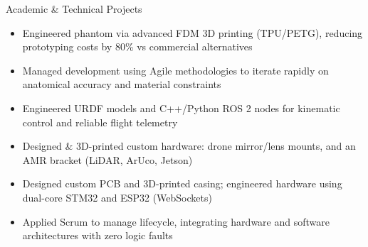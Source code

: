 \documentclass{resume}
\begin{document}
\begin{experienceSection}{Academic \& Technical Projects}
    \projectItem[
        title={Open-Source Gastrointestinal Medical Phantom},
        duration={Ago-Dic 2025 – Feb-Jun 2026},
        keyHighlight={Medical phantom via advanced FDM 3D printing}
    ]
    \begin{itemize}
        \vspace{-0.5em}
        \itemsep -6pt {}
        \item Engineered phantom via advanced FDM 3D printing (TPU/PETG), reducing prototyping costs by 80\% vs commercial alternatives
        \item Managed development using Agile methodologies to iterate rapidly on anatomical accuracy and material constraints
    \end{itemize}
    \projectItem[
        title={Port Automation \& Drone Sim},
        duration={Ago-Dic 2025},
        keyHighlight={Developed a port simulation environment utilizing ROS 2 and Gazebo in partnership with OMRON}
    ]
    \begin{itemize}
        \vspace{-0.5em}
        \itemsep -6pt {}
        \item Engineered URDF models and C++/Python ROS 2 nodes for kinematic control and reliable flight telemetry
        \item Designed \& 3D-printed custom hardware: drone mirror/lens mounts, and an AMR bracket (LiDAR, ArUco, Jetson)
    \end{itemize}
    \projectItem[
        title={DigiMix},
        duration={Ago-Dic 2024},
        keyHighlight={Designed an embedded system integrating custom hardware and digital interfaces with Intel}
    ]
    \begin{itemize}
        \vspace{-0.5em}
        \itemsep -6pt {}
        \item Designed custom PCB and 3D-printed casing; engineered hardware using dual-core STM32 and ESP32 (WebSockets)
        \item Applied Scrum to manage lifecycle, integrating hardware and software architectures with zero logic faults
    \end{itemize}
\end{experienceSection}
\end{document}
